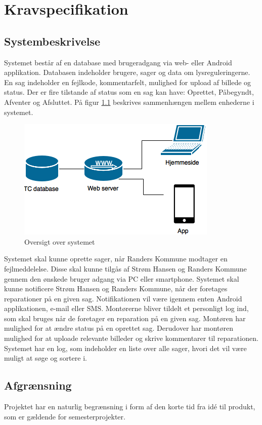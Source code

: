 	\chapter{Kravspecifikation}
	
	\section{Systembeskrivelse}
			Systemet består af en database med brugeradgang via web- eller Android applikation.
			Databasen indeholder brugere, sager og data om lysreguleringerne.
			En sag indeholder en fejlkode, kommentarfelt, mulighed for upload af billede og status.
			Der er fire tilstande af status som en sag kan have: Oprettet, Påbegyndt, Afventer og Afsluttet. På figur \ref{fig:OversigtSystembeskrivelse} beskrives sammenhængen mellem enhederne i systemet.
			
			\begin{figure}[H]
				\centering
				\includegraphics[width=0.6\linewidth]{Kravspecifikation/Oversigtoversystem}
				\caption{Oversigt over systemet}
				\label{fig:OversigtSystembeskrivelse}
			\end{figure}
			
			Systemet skal kunne oprette sager, når Randers Kommune modtager en fejlmeddelelse.
			Disse skal kunne tilgås af Strøm Hansen og Randers Kommune gennem den ønskede bruger adgang via PC eller smartphone.
			Systemet skal kunne notificere Strøm Hansen og Randers Kommune, når der foretages reparationer på en given sag. Notifikationen vil være igennem enten Android applikationen, e-mail eller SMS.
			Montørerne bliver tildelt et personligt log ind, som skal bruges når de foretager en reparation på en given sag.
			Montøren har mulighed for at ændre status på en oprettet sag. Derudover har montøren mulighed for at uploade relevante billeder og skrive kommentarer til reparationen.
			Systemet har en log, som indeholder en liste over alle sager, hvori det vil være muligt at søge og sortere i.
			
			
			\section{Afgrænsning}
			Projektet har en naturlig begrænsning i form af den korte tid fra idé til produkt, som er gældende for semesterprojekter. 
			
